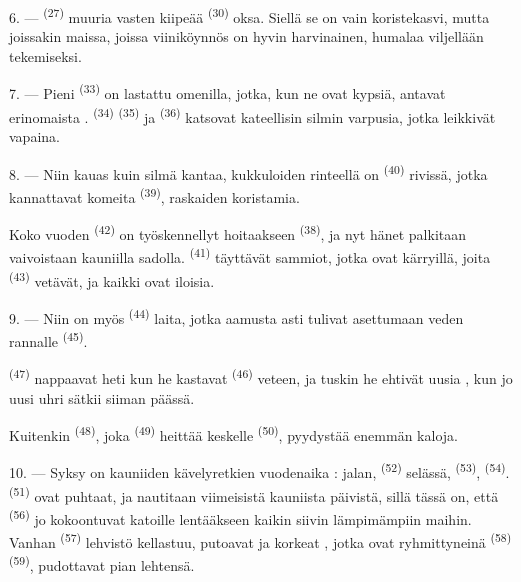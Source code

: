 \VUsaut{6.0mm}
\VUsaut{3.4mm}

6. ---  \textsuperscript{(27)} muuria vasten kiipeää
 \textsuperscript{(30)} oksa. Siellä se on vain koristekasvi,
mutta joissakin maissa, joissa viiniköynnös on hyvin harvinainen, humalaa
viljellään  tekemiseksi.

7. --- Pieni  \textsuperscript{(33)} on lastattu omenilla,
jotka, kun ne ovat kypsiä, antavat erinomaista .
 \textsuperscript{(34)} 
\textsuperscript{(35)} ja  \textsuperscript{(36)} katsovat
kateellisin silmin varpusia, jotka leikkivät vapaina.

8. --- Niin kauas kuin silmä kantaa, kukkuloiden rinteellä on 
\textsuperscript{(40)} rivissä, jotka kannattavat komeita 
\textsuperscript{(39)}, raskaiden  koristamia.

Koko vuoden  \textsuperscript{(42)} on työskennellyt
hoitaakseen  \textsuperscript{(38)}, ja nyt hänet
palkitaan vaivoistaan kauniilla sadolla. 
\textsuperscript{(41)} täyttävät sammiot, jotka ovat kärryillä, joita
 \textsuperscript{(43)} vetävät, ja kaikki ovat iloisia.

\VUsaut{5.0mm}
\VUsaut{3.4mm}

9. --- Niin on myös  \textsuperscript{(44)} laita, jotka
aamusta asti tulivat asettumaan veden rannalle 
\textsuperscript{(45)}.

 \textsuperscript{(47)} nappaavat  heti kun he
kastavat  \textsuperscript{(46)} veteen, ja tuskin he ehtivät
uusia , kun jo uusi uhri sätkii siiman päässä.

Kuitenkin  \textsuperscript{(48)}, joka
 \textsuperscript{(49)} heittää 
keskelle  \textsuperscript{(50)}, pyydystää enemmän kaloja.

10. --- Syksy on kauniiden kävelyretkien vuodenaika : jalan, 
\textsuperscript{(52)} selässä,  \textsuperscript{(53)},
 \textsuperscript{(54)}.  \textsuperscript{(51)}
ovat puhtaat, ja nautitaan viimeisistä kauniista päivistä, sillä tässä on, että
 \textsuperscript{(56)} jo kokoontuvat katoille lentääkseen
kaikin siivin lämpimämpiin maihin. Vanhan 
\textsuperscript{(57)} lehvistö kellastuu,  putoavat ja korkeat
, jotka ovat ryhmittyneinä 
\textsuperscript{(58)}  \textsuperscript{(59)}, pudottavat
pian lehtensä.

